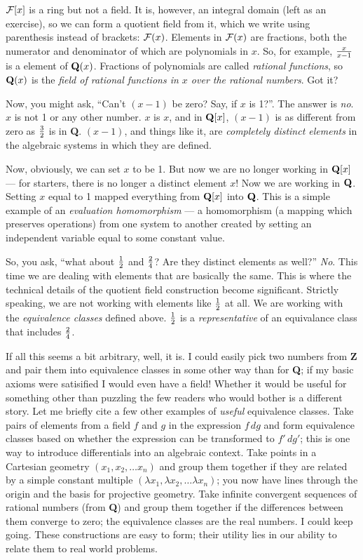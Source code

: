 ${\cal F}[x]$ is a ring but not a field.  It is, however, an
integral domain (left as an exercise), so we can form a quotient field
from it, which we write using parenthesis instead of brackets: ${\cal
F}(x)$.  Elements in ${\cal F}(x)$ are fractions, both the numerator
and denominator of which are polynomials in $x$.  So, for example,
${x}\over{x-1}$ is a element of ${\bf Q}(x)$.  Fractions of
polynomials are called {\it rational functions}, so ${\bf Q}(x)$ is
the {\it field of rational functions in $x$ over the rational numbers}.
Got it?

Now, you might ask, ``Can't $(x-1)$ be zero?  Say, if $x$ is 1?''.
The answer is {\it no}.  $x$ is not 1 or any other number.  $x$ is
$x$, and in ${\bf Q}[x]$, $(x-1)$ is as different from zero as $3
\over 2$ is in {\bf Q}.  $(x-1)$, and things like it, are {\it
completely distinct elements} in the algebraic systems in which they
are defined.

Now, obviously, we can set $x$ to be 1.  But now we are no longer
working in ${\bf Q}[x]$ --- for starters, there is no longer a
distinct element $x$!  Now we are working in ${\bf Q}$.  Setting $x$
equal to 1 mapped everything from ${\bf Q}[x]$ into ${\bf Q}$.  This
is a simple example of an {\it evaluation homomorphism} --- a
homomorphism (a mapping which preserves operations) from one system to
another created by setting an independent variable equal to some
constant value.

So, you ask, ``what about $1\over2$ and $2\over4$?  Are they distinct
elements as well?''  {\it No}.  This time we are dealing with elements
that are basically the same. This is where the technical details of
the quotient field construction become significant.  Strictly
speaking, we are not working with elements like $1\over2$ at all.  We
are working with the {\it equivalence classes} defined above.
$1\over2$ is a {\it representative} of an equivalance class that
includes $2\over4$.

If all this seems a bit arbitrary, well, it is.  I could easily pick
two numbers from {\bf Z} and pair them into equivalence classes in
some other way than for {\bf Q}; if my basic axioms were satisified I
would even have a field!  Whether it would be useful for something
other than puzzling the few readers who would bother is a different
story.  Let me briefly cite a few other examples of {\it useful}
equivalence classes.  Take pairs of elements from a field $f$ and $g$
in the expression $f\,dg$ and form equivalence classes based on
whether the expression can be transformed to $f'\,dg'$; this is one
way to introduce differentials into an algebraic context.  Take points
in a Cartesian geometry $(x_1, x_2,\ldots x_n)$ and group them
together if they are related by a simple constant multiple $(\lambda
x_1, \lambda x_2,\ldots \lambda x_n)$; you now have lines through the
origin and the basis for projective geometry.  Take infinite
convergent sequences of rational numbers (from {\bf Q}) and group them
together if the differences between them converge to zero; the
equivalence classes are the real numbers.  I could keep going.  These
constructions are easy to form; their utility lies in our ability to
relate them to real world problems.


